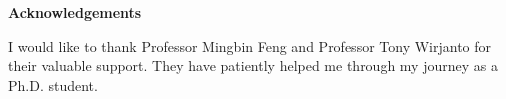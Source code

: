 \cleardoublepage


\begin{center}\textbf{Acknowledgements}\end{center}

I would like to thank Professor Mingbin Feng and Professor Tony Wirjanto for their valuable support. They have patiently helped me through my journey as a Ph.D. student.  
\cleardoublepage

\renewcommand\contentsname{Table of Contents}
\tableofcontents
\cleardoublepage
{}    %

\listoftables
\cleardoublepage
{}		%

\listoffigures
\cleardoublepage
{}		%

\printglossaries
\cleardoublepage
{}		%


